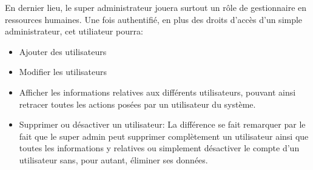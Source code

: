 En dernier lieu, le super administrateur jouera surtout un rôle de gestionnaire en ressources 
humaines. Une fois authentifié, en plus des droits d'accès d'un simple administrateur, 
cet utiliateur pourra:
\begin{itemize}
    \item Ajouter des utilisateurs
    \item Modifier les utilisateurs
    \item Afficher les informations relatives aux différents utilisateurs, pouvant 
    ainsi retracer toutes les actions posées par un utilisateur du système.
    \item Supprimer ou désactiver un utilisateur: La différence se fait remarquer 
    par le fait que le super admin peut supprimer complètement un utilisateur ainsi 
    que toutes les informations y relatives ou simplement désactiver le compte d'un 
    utilisateur sans, pour autant, éliminer ses données.
\end{itemize}

